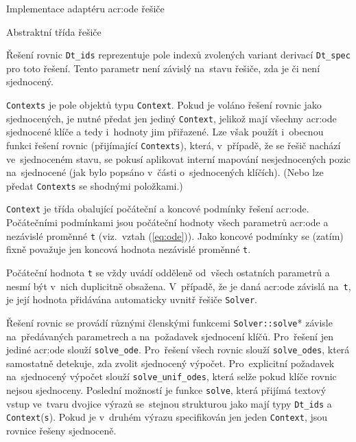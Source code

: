 \documentclass[thesis=M,czech]{FITthesis}[2012/06/26]
\newcommand{\acrlabel}[1]{acr:#1}
\newcommand{\acr}[1]{\acrshort{\acrlabel{#1}}}
\newcommand{\id}[1]{\texttt{#1}}
\newcommand{\rf}[1]{\ref{#1}}
\newcommand{\rfeq}[1]{(\rf{eq:#1})}
\begin{document}
\begin{section}{Implementace adaptéru \acr{ode} řešiče}
\begin{subsection}{Abstraktní třída řešiče}
\begin{subsubsection}{Řešení rovnic}
\id{Dt\_\-ids} reprezentuje pole indexů
zvolených variant derivací \id{Dt\_\-spec}
pro toto řešení.
Tento parametr není závislý na~stavu řešiče,
zda je či není sjednocený.

\id{Contexts} je pole objektů typu \id{Context}.
Pokud je voláno řešení rovnic jako sjednocených,
je nutné předat jen jediný \id{Context},
jelikož mají všechny \acr{ode} sjednocené klíče
a tedy i~hodnoty jim přiřazené.
Lze však použít i~obecnou funkci řešení rovnic
(přijímající \id{\id{Contexts}}),
která, v~případě, že se řešič nachází ve~sjednoceném stavu,
se pokusí aplikovat interní mapování
nesjednocených pozic na~sjednocené
(jak bylo popsáno v~části o~sjednocených klíčích).
(Nebo lze předat \id{Contexts} se shodnými položkami.)


\begin{paragraph}{\id{Context}}\label{p:impl:ode:solver:solve:ctx}
je třída obalující počáteční a koncové podmínky
řešení \acr{ode}.
Počátečními podmínkami
jsou počáteční hodnoty všech parametrů \acr{ode}
a nezávislé proměnné \id{t}
(viz.~vztah \rfeq{ode}).
Jako koncové podmínky se (zatím)
fixně považuje jen koncová hodnota
nezávislé proměnné \id{t}.

Počáteční hodnota \id{t} se vždy uvádí
odděleně od~všech ostatních parametrů
a nesmí být v~nich duplicitně obsažena.
V~případě, že je daná \acr{ode}
závislá na~\id{t},
je její hodnota přidávána automaticky
uvnitř řešiče \id{Solver}.
\end{paragraph} %


\bigskip

Řešení rovnic se provádí různými členskými funkcemi
\id{Solver::\-solve}*
závisle na~předávaných parametrech
a na~požadavek sjednocení klíčů.
Pro~řešení jen jediné \acr{ode}
slouží \id{solve\_\-ode}.
Pro~řešení všech rovnic
slouží \id{solve\_\-odes},
která samostatně detekuje,
zda zvolit sjednocený výpočet.
Pro~explicitní požadavek na~sjednocený výpočet
slouží \id{solve\_\-unif\_\-odes},
která selže pokud klíče rovnic nejsou sjednoceny.
Poslední možností je funkce \id{solve},
která přijímá textový vstup
ve~tvaru dvojice výrazů
se~stejnou strukturou jako mají typy
\id{Dt\_\-ids} a \id{Context}(\id{s}).
Pokud je v~druhém výrazu specifikován jen jeden \id{Context},
jsou rovnice řešeny sjednoceně.
\end{subsubsection} %



\end{subsection}
\end{section}
\end{document}
